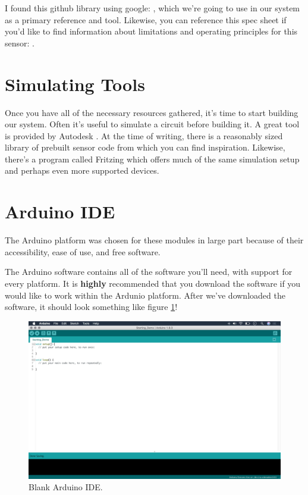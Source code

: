 \documentclass[a4paper]{article}
\begin{document}
I found this github library using google:
\cite{TSL2561_Github}, which we're going to use in our system as a primary reference and tool. Likewise, you can reference this spec sheet if you'd like to find information about limitations and operating principles for this sensor: \cite{TSL2561_Specs}.

\section{Simulating Tools}
Once you have all of the necessary resources gathered, it's time to start building our system. Often it's useful to simulate a circuit before building it. A great tool is provided by Autodesk \cite{circuit_tool}. At the time of writing, there is a reasonably sized library of prebuilt sensor code from which you can find inspiration. Likewise, there's a program called Fritzing \cite{fritzing} which offers much of the same simulation setup and perhaps even more supported devices.

\section{Arduino IDE}
The Arduino platform was chosen for these modules in large part because of their accessibility, ease of use, and free software.

The Arduino software \cite{arduino} contains all of the software you'll need, with support for every platform. It is \textbf{highly} recommended that you download the software if you would like to work within the Ardunio platform. After we've downloaded the software, it should look something like figure \ref{fig:a_ide}! 

\begin{figure}
\centering
\includegraphics[width=1\textwidth]{a_ide.jpg}
\caption{Blank Arduino IDE.}
\label{fig:a_ide}
\end{figure}
\end{document}
